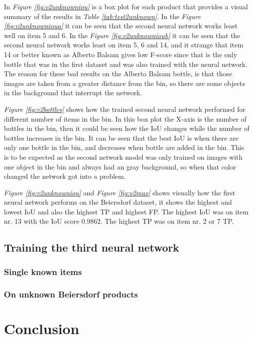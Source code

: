 In \textit{Figure \ref{fig:v2unknowniou}} is a box plot for each product that provides a visual summary of the results in \textit{Table \ref{tab:test2unknown}}. In the \textit{Figure \ref{fig:v2unknownioua}} it can be seen that the second neural network works least well on item 5 and 6. In the \textit{Figure \ref{fig:v2unknownioub}} it can be seen that the second neural network works least on item 5, 6 and 14, and it strange that item 14 or better known as Alberto Balsam gives low F-score since that is the only bottle that was in the first dataset and was also trained with the neural network. The reason for these bad results on the Alberto Balsam bottle, is that those images are taken from a greater distance from the bin, so there are some objects in the background that interrupt the network. 

\textit{Figure \ref{fig:v2bottles}} shows how the trained second neural network performed for different number of items in the bin. In this box plot the X-axis is the number of bottles in the bin, then it could be seen how the IoU changes while the number of bottles increases in the bin. It can be seen that the best IoU is when there are only one bottle in the bin, and decreases when bottle are added in the bin. This is to be expected as the second network model was only trained on images with one object in the bin and always had an gray background, so when that color changed the network got into a problem.

\textit{Figure \ref{fig:v2unknowniou}} and \textit{Figure \ref{fig:v2max}} shows visually how the first neural network performs on the Beiersdorf dataset, it shows the highest and lowest IoU and also the highest TP and highest FP. The highest IoU was on item nr. 13 with the IoU score 0.9862. The highest TP was on item nr. 2 or 7 TP.



\subsection{Training the third neural network}

\subsubsection{Single known items}

\subsubsection{On unknown Beiersdorf products}


\section{Conclusion\label{sec:conclusions}}
